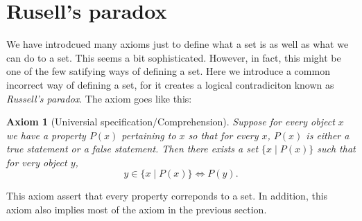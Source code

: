 \documentclass[a4paper]{book}
\theoremstyle{break}
\newtheorem{axiom}{Axiom}[chapter]
\begin{document}
		\section{Rusell's paradox}
			We have introdcued many axioms just to define what a set is as well as what we can do to a set. This seems a bit sophisticated. However, in fact, this might be one of the few satifying ways of defining a set. Here we introduce a common incorrect way of defining a set, for it creates a logical contradiciton known as \textit{Russell's paradox}. The axiom goes like this:
			\begin{axiom}[Universial specification/Comprehension]\marginnote{\hfill\dbend}
				Suppose for every object $x$ we have a property $P(x)$ pertaining to $x$ so that for every $x$, $P(x)$ is either a true statement or a false statement. Then there exists a set $\{x\mid P(x)\}$ such that for very object $y$, $$y\in\{x\mid P(x)\}\iff P(y).$$
			\end{axiom}
			This axiom assert that every property correponds to a set. In addition, this axiom also implies most of the axiom in the previous section.
\end{document}
